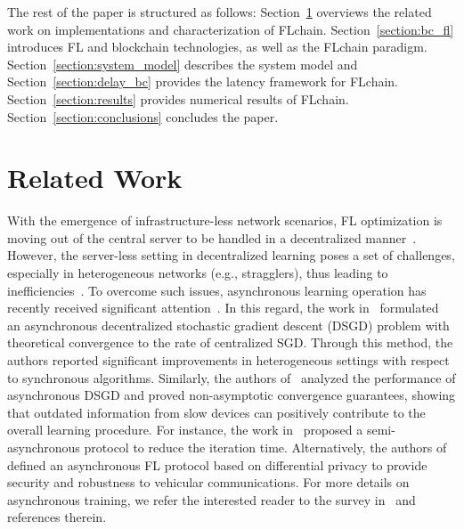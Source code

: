 \documentclass[lettersize,journal]{IEEEtran}
\begin{document}
The rest of the paper is structured as follows: Section~\ref{section:related_work} overviews the related work on implementations and characterization of FLchain. Section~\ref{section:bc_fl} introduces FL and blockchain technologies, as well as the FLchain paradigm. Section~\ref{section:system_model} describes the system model and Section~\ref{section:delay_bc} provides the latency framework for FLchain. Section~\ref{section:results} provides numerical results of FLchain. Section~\ref{section:conclusions} concludes the paper.

\section{Related Work}
\label{section:related_work}

With the emergence of infrastructure-less network scenarios, FL optimization is moving out of the central server to be handled in a decentralized manner~\cite{lalitha2018fully,hegedHus2021decentralized}. However, the server-less setting in decentralized learning poses a set of challenges, especially in heterogeneous networks (e.g., stragglers), thus leading to inefficiencies~\cite{chen2018lag}. To overcome such issues, asynchronous learning operation has recently received significant attention~\cite{xie2019asynchronous}. In this regard, the work in~\cite{lian2018asynchronous} formulated an asynchronous decentralized stochastic gradient descent (DSGD) problem with theoretical convergence to the rate of centralized SGD. Through this method, the authors reported significant improvements in heterogeneous settings with respect to synchronous algorithms. Similarly, the authors of~\cite{jeong2022asynchronous} analyzed the performance of asynchronous DSGD and proved non-asymptotic convergence guarantees, showing that outdated information from slow devices can positively contribute to the overall learning procedure. For instance, the work in~\cite{wu2020safa} proposed a semi-asynchronous protocol to reduce the iteration time. Alternatively, the authors of~\cite{lu2019differentially} defined an asynchronous FL protocol based on differential privacy to provide security and robustness to vehicular communications. For more details on asynchronous training, we refer the interested reader to the survey in~\cite{xu2021asynchronous} and references therein.
\end{document}
